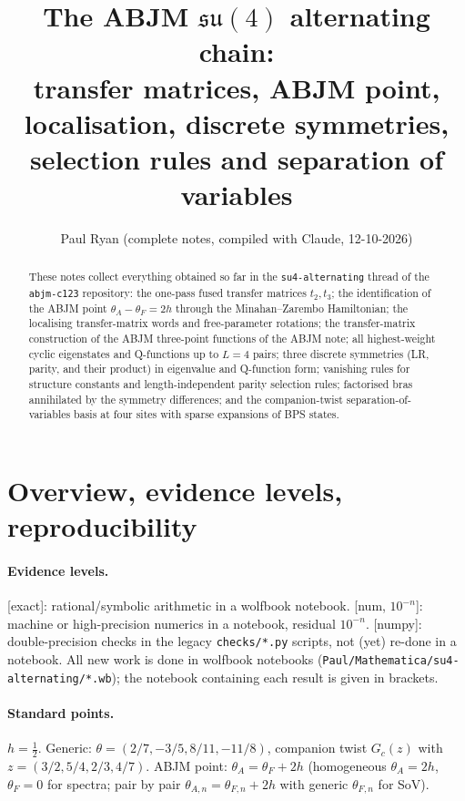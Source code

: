 \documentclass[11pt]{article}
\title{The ABJM $\mathfrak{su}(4)$ alternating chain:\\[2pt]
transfer matrices, ABJM point, localisation, discrete symmetries,\\ selection rules and separation of variables}
\author{Paul Ryan \qquad (complete notes, compiled with Claude, 12-10-2026)}
\date{}
\newcommand{\nb}[1]{\texttt{#1}}
\newcommand{\ex}{\textsf{[exact]}}
\newcommand{\num}[1]{\textsf{[num, $#1$]}}
\newcommand{\npy}{\textsf{[numpy]}}
\begin{document}
\maketitle

\begin{abstract}
\noindent These notes collect everything obtained so far in the \nb{su4-alternating} thread of the \nb{abjm-c123}
repository: the one-pass fused transfer matrices $t_2,t_3$; the identification of the ABJM point
$\theta_A-\theta_F=2h$ through the Minahan--Zarembo Hamiltonian; the localising transfer-matrix words and free-parameter
rotations; the transfer-matrix construction of the ABJM three-point functions of the ABJM note; all highest-weight
cyclic eigenstates and Q-functions up to $L=4$ pairs; three discrete symmetries (LR, parity, and their product) in
eigenvalue and Q-function form; vanishing rules for structure constants and length-independent parity selection rules;
factorised bras annihilated by the symmetry differences; and the companion-twist separation-of-variables basis at four
sites with sparse expansions of BPS states.
\end{abstract}

\tableofcontents

\section{Overview, evidence levels, reproducibility}

\paragraph{Evidence levels.} \ex: rational/symbolic arithmetic in a wolfbook notebook. \num{10^{-n}}: machine or
high-precision numerics in a notebook, residual $10^{-n}$. \npy: double-precision checks in the legacy
\nb{checks/*.py} scripts, not (yet) re-done in a notebook. All new work is done in wolfbook notebooks
(\nb{Paul/Mathematica/su4-alternating/*.wb}); the notebook containing each result is given in brackets.

\paragraph{Standard points.} $h=\tfrac12$. Generic: $\theta=(2/7,-3/5,8/11,-11/8)$, companion twist $G_c(z)$ with
$z=(3/2,5/4,2/3,4/7)$. ABJM point: $\theta_A=\theta_F+2h$ (homogeneous $\theta_A=2h$, $\theta_F=0$ for spectra; pair by pair
$\theta_{A,n}=\theta_{F,n}+2h$ with generic $\theta_{F,n}$ for SoV).
\end{document}

